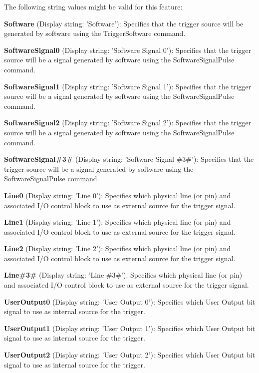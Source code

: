 The following string values might be valid for this feature\+:
\begin{DoxyItemize}
\item {\bfseries Software} (Display string\+: 'Software')\+: Specifies that the trigger source will be generated by software using the Trigger\+Software command.
\item {\bfseries Software\+Signal0} (Display string\+: 'Software Signal 0')\+: Specifies that the trigger source will be a signal generated by software using the Software\+Signal\+Pulse command.
\item {\bfseries Software\+Signal1} (Display string\+: 'Software Signal 1')\+: Specifies that the trigger source will be a signal generated by software using the Software\+Signal\+Pulse command.
\item {\bfseries Software\+Signal2} (Display string\+: 'Software Signal 2')\+: Specifies that the trigger source will be a signal generated by software using the Software\+Signal\+Pulse command.
\item {\bfseries Software\+Signal\#3\#} (Display string\+: 'Software Signal \#3\#')\+: Specifies that the trigger source will be a signal generated by software using the Software\+Signal\+Pulse command.
\item {\bfseries Line0} (Display string\+: 'Line 0')\+: Specifies which physical line (or pin) and associated I/\+O control block to use as external source for the trigger signal.
\item {\bfseries Line1} (Display string\+: 'Line 1')\+: Specifies which physical line (or pin) and associated I/\+O control block to use as external source for the trigger signal.
\item {\bfseries Line2} (Display string\+: 'Line 2')\+: Specifies which physical line (or pin) and associated I/\+O control block to use as external source for the trigger signal.
\item {\bfseries Line\#3\#} (Display string\+: 'Line \#3\#')\+: Specifies which physical line (or pin) and associated I/\+O control block to use as external source for the trigger signal.
\item {\bfseries User\+Output0} (Display string\+: 'User Output 0')\+: Specifies which User Output bit signal to use as internal source for the trigger.
\item {\bfseries User\+Output1} (Display string\+: 'User Output 1')\+: Specifies which User Output bit signal to use as internal source for the trigger.
\item {\bfseries User\+Output2} (Display string\+: 'User Output 2')\+: Specifies which User Output bit signal to use as internal source for the trigger.

\end{DoxyItemize}
